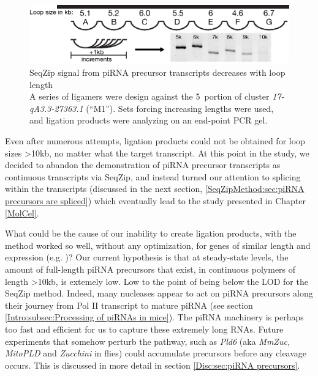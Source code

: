     \begin{figure} %
      \centering
      \includegraphics{Figures/SeqZipMethod/piRNAprecusorM1SignalDecreasesWithLoopLength.eps}
      \caption[SeqZip signal from piRNA precursor transcripts decreases with loop length]
      {
        SeqZip signal from piRNA precursor transcripts decreases with loop length\\[0.25cm]
        A series of ligamers were design against the 5\textprime~portion of cluster \textit{17-qA3.3-27363.1} (``M1''). Sets forcing increasing lengths were used, and ligation products were analyzing on an end-point PCR gel.
        }
      \label{SeqZipMethod:fig:piRNA precusors and loop length}
      \end{figure}

    Even after numerous attempts, ligation products could not be obtained for loop sizes >10kb, no matter what the target transcript. At this point in the study, we decided to abandon the demonstration of piRNA precursor transcripts as continuous transcripts via SeqZip, and instead turned our attention to splicing within the transcripts (discussed in the next section, \ref{SeqZipMethod:sec:piRNA precursors are spliced}) which eventually lead to the study presented in Chapter \ref{MolCel}.

    What could be the cause of our inability to create ligation products, with the method worked so well, without any optimization, for genes of similar length and expression (e.g. \dst{})? Our current hypothesis is that at steady-state levels, the amount of full-length piRNA precursors that exist, in continuous polymers of length >10kb, is extemely low. Low to the point of being below the LOD for the SeqZip method. Indeed, many nucleases appear to act on piRNA precursors along their journey from Pol II transcript to mature piRNA (see section \ref{Intro:subsec:Processing of piRNAs in mice}). The piRNA machinery is perhaps too fast and efficient for us to capture these extremely long RNAs. Future experiments that somehow perturb the pathway, such as \textit{Pld6} (aka \textit{MmZuc, MitoPLD} and \textit{Zucchini} in flies) could accumulate precursors before any cleavage occurs. This is discussed in more detail in section \ref{Disc:sec:piRNA precursors}.

